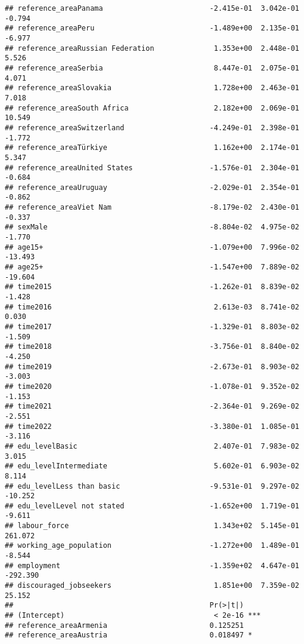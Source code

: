 \documentclass[
]{article}
\begin{document}
\begin{verbatim}
## reference_areaPanama                         -2.415e-01  3.042e-01   -0.794
## reference_areaPeru                           -1.489e+00  2.135e-01   -6.977
## reference_areaRussian Federation              1.353e+00  2.448e-01    5.526
## reference_areaSerbia                          8.447e-01  2.075e-01    4.071
## reference_areaSlovakia                        1.728e+00  2.463e-01    7.018
## reference_areaSouth Africa                    2.182e+00  2.069e-01   10.549
## reference_areaSwitzerland                    -4.249e-01  2.398e-01   -1.772
## reference_areaTürkiye                         1.162e+00  2.174e-01    5.347
## reference_areaUnited States                  -1.576e-01  2.304e-01   -0.684
## reference_areaUruguay                        -2.029e-01  2.354e-01   -0.862
## reference_areaViet Nam                       -8.179e-02  2.430e-01   -0.337
## sexMale                                      -8.804e-02  4.975e-02   -1.770
## age15+                                       -1.079e+00  7.996e-02  -13.493
## age25+                                       -1.547e+00  7.889e-02  -19.604
## time2015                                     -1.262e-01  8.839e-02   -1.428
## time2016                                      2.613e-03  8.741e-02    0.030
## time2017                                     -1.329e-01  8.803e-02   -1.509
## time2018                                     -3.756e-01  8.840e-02   -4.250
## time2019                                     -2.673e-01  8.903e-02   -3.003
## time2020                                     -1.078e-01  9.352e-02   -1.153
## time2021                                     -2.364e-01  9.269e-02   -2.551
## time2022                                     -3.380e-01  1.085e-01   -3.116
## edu_levelBasic                                2.407e-01  7.983e-02    3.015
## edu_levelIntermediate                         5.602e-01  6.903e-02    8.114
## edu_levelLess than basic                     -9.531e-01  9.297e-02  -10.252
## edu_levelLevel not stated                    -1.652e+00  1.719e-01   -9.611
## labour_force                                  1.343e+02  5.145e-01  261.072
## working_age_population                       -1.272e+00  1.489e-01   -8.544
## employment                                   -1.359e+02  4.647e-01 -292.390
## discouraged_jobseekers                        1.851e+00  7.359e-02   25.152
##                                              Pr(>|t|)    
## (Intercept)                                   < 2e-16 ***
## reference_areaArmenia                        0.125251    
## reference_areaAustria                        0.018497 *  

\end{verbatim}
\end{document}
